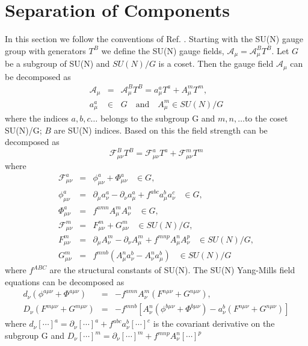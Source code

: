 \documentclass[a4paper,aps,showpacs]{revtex4}
\begin{document}
\section{Separation of Components}

In this section we follow the conventions of
Ref. \cite{kondo}. Starting with the SU(N)
gauge group with generators $T^B$ we define the SU(N)
gauge fields, $\mathcal{A}_\mu=
\mathcal{A}^B_\mu T^B$. Let $G$ be a subgroup
of SU(N) and $SU(N)/G$ is a coset. Then the gauge field
$\mathcal{A}_\mu$ can be decomposed as
\begin{eqnarray}
  \mathcal{A}_\mu & = & \mathcal{A}^B_\mu T^B = a^a_\mu T^a + A^m_\mu T^m ,
\label{sec2-10a}\\
  a^a_\mu & \in & G \quad \text{and} \quad A^m_\mu \in SU(N)/G
\label{sec2-10b}
\end{eqnarray}
where the indices $a,b,c \ldots $ belongs to the subgroup G and
$m,n, \ldots $to the coset SU(N)/G; $B$ are SU(N) indices.
Based on this the field strength can be decomposed as
\begin{equation}
  \mathcal{F}^B_{\mu\nu} T^B = \mathcal{F}^a_{\mu\nu}T^a +
  \mathcal{F}^m_{\mu\nu}T^m
\label{sec2-20}
\end{equation}
where
\begin{eqnarray}
  \mathcal{F}^a_{\mu\nu} & = & \phi ^a_{\mu\nu} + \Phi^a_{\mu\nu}
  \; \; \; \in G ,
\label{sec2-30a}\\
  \phi ^a_{\mu\nu} & = & \partial_\mu a^a_\nu - \partial_\nu a^a_\mu +
  f^{abc}a^b_\mu a^c_\nu \; \; \; \in G ,
\label{sec2-30b}\\
  \Phi^a_{\mu\nu} & = & f^{amn} A^m_\mu A^n_\nu \; \; \; \in G ,
\label{sec2-30c}\\
  \mathcal{F}^m_{\mu\nu} & = & F^m_{\mu\nu} + G^m_{\mu\nu} \; \; \;
  \in SU(N)/G ,
\label{sec2-30d}\\
  F^m_{\mu\nu} & = & \partial_\mu A^m_\nu - \partial_\nu A^m_\mu +
  f^{mnp} A^n_\mu A^p_\nu \; \; \; \in SU(N)/G ,
\label{sec2-30e}\\
  G^m_{\mu\nu} & = & f^{mnb}
  \left(
  A^n_\mu a^b_\nu - A^n_\nu a^b_\mu
  \right) \; \; \; \in SU(N)/G
\end{eqnarray}
where $f^{ABC}$ are the structural constants of
SU(N). The SU(N) Yang-Mills field equations can be decomposed
as
\begin{eqnarray}
  d_\nu \left( \phi ^{a\mu\nu} +\Phi^{a\mu\nu} \right) & = &
  -f^{amn} A^m_\nu
  \left(
  F^{n\mu\nu} + G^{n\mu\nu}
  \right) ,
\label{sec2-40a}\\
  D_\nu \left( F^{m\mu\nu} + G^{m\mu\nu} \right) & = &
  - f^{mnb}
  \left[
  A^n_\nu \left( \phi ^{b\mu\nu} + \Phi^{b\mu\nu} \right) -
  a^b_\nu \left( F^{n\mu\nu} + G^{n\mu\nu} \right)
  \right]
\label{sec2-40b}
\end{eqnarray}
where $d_\nu [\cdots]^a = \partial_\nu [\cdots]^a +
f^{abc} a^b_\nu [\cdots]^c$ is the covariant derivative on the
subgroup G and
$D_\nu [\cdots]^m = \partial_\nu [\cdots]^m +
f^{mnp} A^n_\nu [\cdots]^p$
\end{document}
